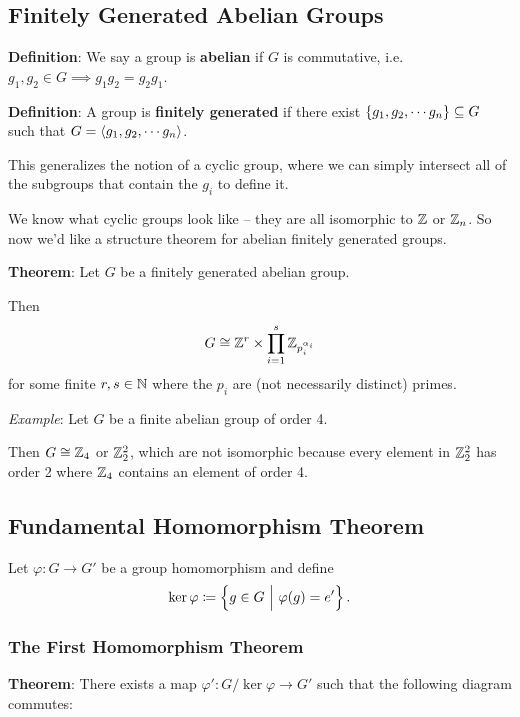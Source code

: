 \hypertarget{finitely-generated-abelian-groups}{%
\subsection{Finitely Generated Abelian
Groups}\label{finitely-generated-abelian-groups}}

\textbf{Definition}: We say a group is \textbf{abelian} if \(G\) is
commutative, i.e.~\(g_1, g_2 \in G \implies g_1 g_2 = g_2 g_1\).

\textbf{Definition}: A group is \textbf{finitely generated} if there
exist \(\left\{{g_1, g_2, \cdots g_n}\right\} \subseteq G\) such that
\(G = \left\langle{g_1, g_2, \cdots g_n}\right\rangle\).

This generalizes the notion of a cyclic group, where we can simply
intersect all of the subgroups that contain the \(g_i\) to define it.

We know what cyclic groups look like -- they are all isomorphic to
\({\mathbb{Z}}\) or \({\mathbb{Z}}_n\). So now we'd like a structure theorem for abelian
finitely generated groups.

\textbf{Theorem}: Let \(G\) be a finitely generated abelian group.

Then
\[G \cong {\mathbb{Z}}^r \times \displaystyle\prod_{i=1}^s {\mathbb{Z}}_{p_i^{\alpha _i}}\]
for some finite \(r,s \in {\mathbb{N}}\) where the \(p_i\) are (not necessarily
distinct) primes.

\emph{Example}: Let \(G\) be a finite abelian group of order 4.

Then \(G \cong {\mathbb{Z}}_4\) or \({\mathbb{Z}}_2^2\), which are not isomorphic because
every element in \({\mathbb{Z}}_2^2\) has order 2 where \({\mathbb{Z}}_4\) contains an
element of order 4.

\hypertarget{fundamental-homomorphism-theorem}{%
\subsection{Fundamental Homomorphism
Theorem}\label{fundamental-homomorphism-theorem}}

Let \(\varphi: G \to G'\) be a group homomorphism and define \[
\ker \varphi \coloneqq \left\{{g\in G {~\mathrel{\Big|}~} \varphi(g) = e'}\right\}
.\]

\hypertarget{the-first-homomorphism-theorem}{%
\subsubsection{The First Homomorphism
Theorem}\label{the-first-homomorphism-theorem}}

\textbf{Theorem}: There exists a map \(\varphi': G/\ker \varphi \to G'\)
such that the following diagram commutes:

